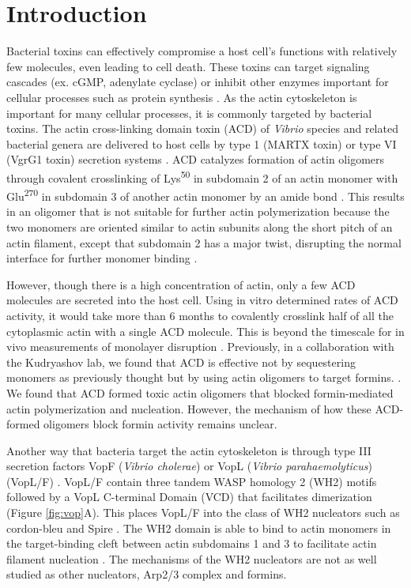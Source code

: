 \section{Introduction}\label{ch04-introduction}
Bacterial toxins can effectively compromise a host cell's functions with relatively few molecules, even leading to cell death. These toxins can target signaling cascades (ex. cGMP, adenylate cyclase) or inhibit other enzymes important for cellular processes such as protein synthesis \citep{henkel_toxins_2010}. As the actin cytoskeleton is important for many cellular processes, it is commonly targeted by bacterial toxins. The actin cross-linking domain toxin (ACD) of \textit{Vibrio} species and related bacterial genera are delivered to host cells by type 1 (MARTX toxin) \citep{sheahan_identification_2004} or type VI (VgrG1 toxin) secretion systems \citep{pukatzki_type_2007}. ACD catalyzes formation of actin oligomers through covalent crosslinking of Lys\textsuperscript{50} in subdomain 2 of an actin monomer with Glu\textsuperscript{270} in subdomain 3 of another actin monomer by an amide bond \citep{kudryashov_connecting_2008,kudryashova_glutamyl_2012}. This results in an oligomer that is not suitable for further actin polymerization because the two monomers are oriented similar to actin subunits along the short pitch of an actin filament, except that subdomain 2 has a major twist, disrupting the normal interface for further monomer binding \citep{kudryashov_connecting_2008}.  

However, though there is a high concentration of actin, only a few ACD molecules are secreted into the host cell. Using in vitro determined rates of ACD activity, it would take more than 6 months to covalently crosslink half of all the cytoplasmic actin with a single ACD molecule. This is beyond the timescale for in vivo measurements of monolayer disruption \citep{kudryashova_glutamyl_2012, heisler_acd_2015}. Previously, in a collaboration with the Kudryashov lab, we found that ACD is effective not by sequestering monomers as previously thought but by using actin oligomers to target formins. \citep{heisler_acd_2015}. We found that ACD formed toxic actin oligomers that blocked formin-mediated actin polymerization and nucleation. However, the mechanism of how these ACD-formed oligomers block formin activity remains unclear. 

Another way that bacteria target the actin cytoskeleton is through type III secretion factors VopF (\textit{Vibrio cholerae}) or VopL (\textit{Vibrio parahaemolyticus}) (VopL/F) \citep{tam_type_2007,liverman_arp2/3-independent_2007}. VopL/F contain three tandem WASP homology 2 (WH2) motifs followed by a VopL C-terminal Domain (VCD) that facilitates dimerization (Figure \ref{fig:vop}A). This places VopL/F into the class of WH2 nucleators such as cordon-bleu and Spire \citep{qualmann_new_2009}. The WH2 domain is able to bind to actin monomers in the target-binding cleft between actin subdomains 1 and 3 to facilitate actin filament nucleation \citep{namgoong_mechanism_2011}. The mechanisms of the WH2 nucleators are not as well studied as other nucleators, Arp2/3 complex and formins. 

